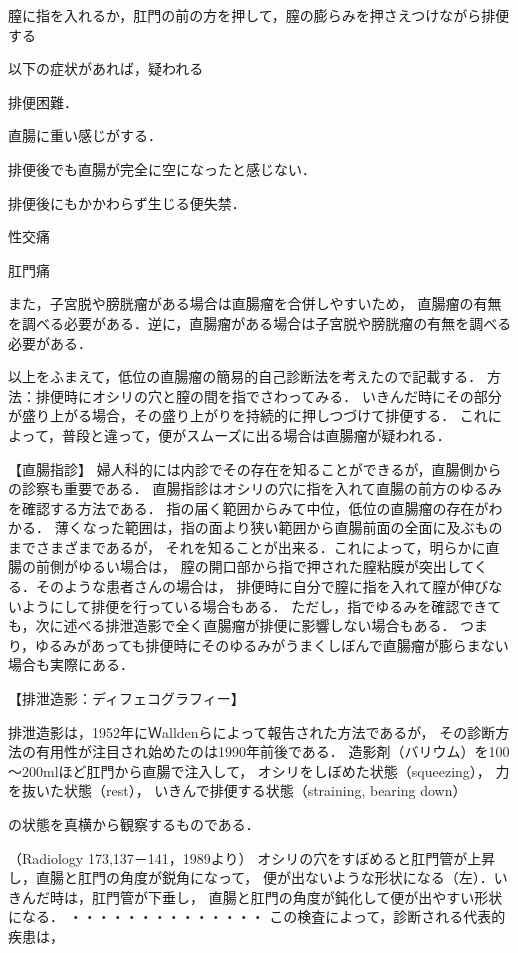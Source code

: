膣に指を入れるか，肛門の前の方を押して，膣の膨らみを押さえつけながら排便する

以下の症状があれば，疑われる


排便困難．

直腸に重い感じがする．

排便後でも直腸が完全に空になったと感じない．

排便後にもかかわらず生じる便失禁．

性交痛

肛門痛

また，子宮脱や膀胱瘤がある場合は直腸瘤を合併しやすいため，
直腸瘤の有無を調べる必要がある．逆に，直腸瘤がある場合は子宮脱や膀胱瘤の有無を調べる必要がある．

以上をふまえて，低位の直腸瘤の簡易的自己診断法を考えたので記載する． 
方法：排便時にオシリの穴と膣の間を指でさわってみる．
いきんだ時にその部分が盛り上がる場合，その盛り上がりを持続的に押しつづけて排便する． 
これによって，普段と違って，便がスムーズに出る場合は直腸瘤が疑われる． 

【直腸指診】
婦人科的には内診でその存在を知ることができるが，直腸側からの診察も重要である．
直腸指診はオシリの穴に指を入れて直腸の前方のゆるみを確認する方法である．
指の届く範囲からみて中位，低位の直腸瘤の存在がわかる．
薄くなった範囲は，指の面より狭い範囲から直腸前面の全面に及ぶものまでさまざまであるが，
それを知ることが出来る．これによって，明らかに直腸の前側がゆるい場合は，
膣の開口部から指で押された膣粘膜が突出してくる．そのような患者さんの場合は，
排便時に自分で膣に指を入れて膣が伸びないようにして排便を行っている場合もある．
ただし，指でゆるみを確認できても，次に述べる排泄造影で全く直腸瘤が排便に影響しない場合もある．
つまり，ゆるみがあっても排便時にそのゆるみがうまくしぼんで直腸瘤が膨らまない場合も実際にある．

【排泄造影：ディフェコグラフィー】

排泄造影は，1952年にＷalldenらによって報告された方法であるが，
その診断方法の有用性が注目され始めたのは1990年前後である．
造影剤（バリウム）を100～200mlほど肛門から直腸で注入して，
オシリをしぼめた状態（squeezing），
力を抜いた状態（rest），
いきんで排便する状態（straining, bearing down）

の状態を真横から観察するものである．




（Radiology 173,137－141，1989より）
オシリの穴をすぼめると肛門管が上昇し，直腸と肛門の角度が鋭角になって，
便が出ないような形状になる（左）．いきんだ時は，肛門管が下垂し，
直腸と肛門の角度が鈍化して便が出やすい形状になる．
・・・・・・・・・・・・・・
この検査によって，診断される代表的疾患は，


